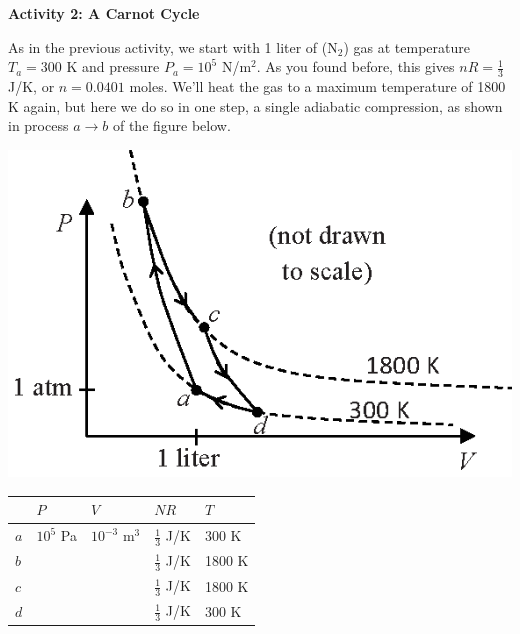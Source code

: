 \vspace{0.3in}

\pagebreak
\textbf{Activity 2: A Carnot Cycle}

As in the previous activity, we start with 1 liter of ($\textrm{N}_2$) gas at temperature $T_a = 300$ K and pressure $P_a = 10^5$ N/m$^2$.   As you found before, this gives $nR=\frac{1}{3}$ J/K, or $n=0.0401$ moles.  We'll heat the gas to a maximum temperature of 1800 K again, but here we do so in one step, a single adiabatic compression, as shown in process $a \rightarrow b$ of the figure below.

\begin{minipage}{0.45\textwidth}
\includegraphics[width=1.0\textwidth]{ideal_gas_cycles/carnot_cycle.eps}
\end{minipage}
\begin{minipage}{0.55\textwidth}
\vspace{0.1 in}
\renewcommand{\arraystretch}{2.0}
\begin{tabular}{| C{0.6in} | C{0.6in} | C{0.6in} | C{0.6in} | C{0.6in} |}
\hline
& $P$ & $V$ & $NR$ & $T$ \\ \hline
$a$ & $10^5$ Pa & $10^{-3}$ m$^3$ & $\frac{1}{3}$ J/K & 300 K \\ \hline
$b$ &                  &                            & $\frac{1}{3}$ J/K & 1800 K \\ \hline
$c$ &                  &                            & $\frac{1}{3}$ J/K & 1800 K \\ \hline
$d$ &                  &                            & $\frac{1}{3}$ J/K & 300 K \\ \hline
\end{tabular}
\renewcommand{\arraystretch}{1.0}
\end{minipage}


